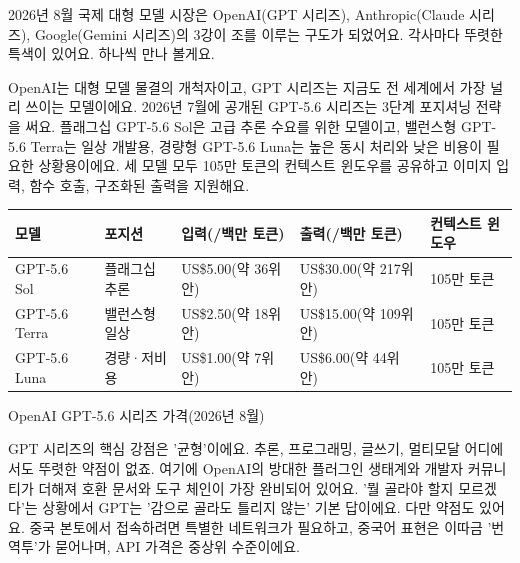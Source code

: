 


2026년 8월 국제 대형 모델 시장은 OpenAI(GPT 시리즈), Anthropic(Claude 시리즈), Google(Gemini 시리즈)의 3강이 조를 이루는 구도가 되었어요. 각사마다 뚜렷한 특색이 있어요. 하나씩 만나 볼게요.


OpenAI는 대형 모델 물결의 개척자이고, GPT 시리즈는 지금도 전 세계에서 가장 널리 쓰이는 모델이에요. 2026년 7월에 공개된 GPT-5.6 시리즈는 3단계 포지셔닝 전략을 써요. 플래그십 GPT-5.6 Sol은 고급 추론 수요를 위한 모델이고, 밸런스형 GPT-5.6 Terra는 일상 개발용, 경량형 GPT-5.6 Luna는 높은 동시 처리와 낮은 비용이 필요한 상황용이에요. 세 모델 모두 105만 토큰의 컨텍스트 윈도우를 공유하고 이미지 입력, 함수 호출, 구조화된 출력을 지원해요.

\begin{center}
\begin{tabularx}{\linewidth}{|X|X|X|X|X|}
\hline
\textbf{모델} & \textbf{포지션} & \textbf{입력(/백만 토큰)} & \textbf{출력(/백만 토큰)} & \textbf{컨텍스트 윈도우} \tabularnewline
\hline
GPT-5.6 Sol & 플래그십 추론 & US\$5.00(약 36위안) & US\$30.00(약 217위안) & 105만 토큰 \tabularnewline
GPT-5.6 Terra & 밸런스형 일상 & US\$2.50(약 18위안) & US\$15.00(약 109위안) & 105만 토큰 \tabularnewline
GPT-5.6 Luna & 경량·저비용 & US\$1.00(약 7위안) & US\$6.00(약 44위안) & 105만 토큰 \tabularnewline
\hline
\end{tabularx}
\end{center}

\begin{center}\small\color{gray}OpenAI GPT-5.6 시리즈 가격(2026년 8월)\end{center}

GPT 시리즈의 핵심 강점은 '균형'이에요. 추론, 프로그래밍, 글쓰기, 멀티모달 어디에서도 뚜렷한 약점이 없죠. 여기에 OpenAI의 방대한 플러그인 생태계와 개발자 커뮤니티가 더해져 호환 문서와 도구 체인이 가장 완비되어 있어요. '뭘 골라야 할지 모르겠다'는 상황에서 GPT는 '감으로 골라도 틀리지 않는' 기본 답이에요. 다만 약점도 있어요. 중국 본토에서 접속하려면 특별한 네트워크가 필요하고, 중국어 표현은 이따금 '번역투'가 묻어나며, API 가격은 중상위 수준이에요.

